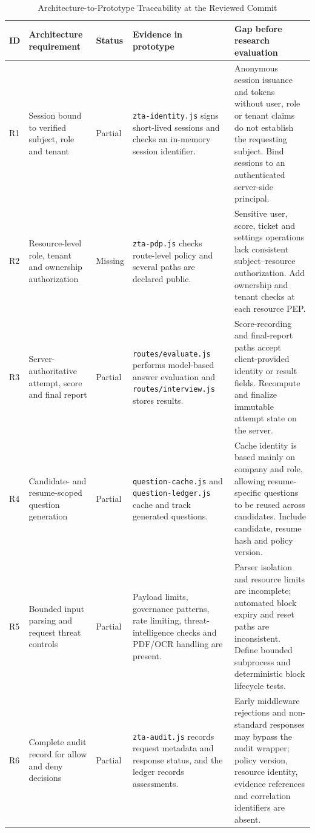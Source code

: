 \documentclass[conference]{IEEEtran}
\begin{document}
\begin{table}[t]
\caption{Architecture-to-Prototype Traceability at the Reviewed Commit}
\label{tab:traceability}
\centering
\scriptsize
\renewcommand{\arraystretch}{1.10}
\begin{tabular}{@{}p{}p{}p{}p{}p{}@{}}
\toprule
\textbf{ID} & \textbf{Architecture requirement} & \textbf{Status} & \textbf{Evidence in prototype} & \textbf{Gap before research evaluation} \\
\midrule
R1 & Session bound to verified subject, role and tenant & Partial & \texttt{zta-identity.js} signs short-lived sessions and checks an in-memory session identifier. & Anonymous session issuance and tokens without user, role or tenant claims do not establish the requesting subject. Bind sessions to an authenticated server-side principal. \\
R2 & Resource-level role, tenant and ownership authorization & Missing & \texttt{zta-pdp.js} checks route-level policy and several paths are declared public. & Sensitive user, score, ticket and settings operations lack consistent subject--resource authorization. Add ownership and tenant checks at each resource PEP. \\
R3 & Server-authoritative attempt, score and final report & Partial & \texttt{routes/evaluate.js} performs model-based answer evaluation and \texttt{routes/interview.js} stores results. & Score-recording and final-report paths accept client-provided identity or result fields. Recompute and finalize immutable attempt state on the server. \\
R4 & Candidate- and resume-scoped question generation & Partial & \texttt{question-cache.js} and \texttt{question-ledger.js} cache and track generated questions. & Cache identity is based mainly on company and role, allowing resume-specific questions to be reused across candidates. Include candidate, resume hash and policy version. \\
R5 & Bounded input parsing and request threat controls & Partial & Payload limits, governance patterns, rate limiting, threat-intelligence checks and PDF/OCR handling are present. & Parser isolation and resource limits are incomplete; automated block expiry and reset paths are inconsistent. Define bounded subprocess and deterministic block lifecycle tests. \\
R6 & Complete audit record for allow and deny decisions & Partial & \texttt{zta-audit.js} records request metadata and response status, and the ledger records assessments. & Early middleware rejections and non-standard responses may bypass the audit wrapper; policy version, resource identity, evidence references and correlation identifiers are absent. \\

\end{tabular}
\end{table}
\end{document}
